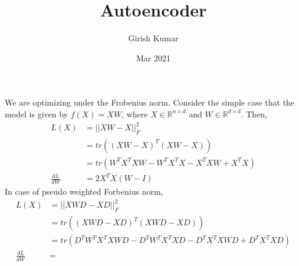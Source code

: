 \documentclass{article}
\title{Autoencoder}
\author{Girish Kumar }
\date{Mar 2021}
\begin{document}
\maketitle

We are optimizing under the Frobenius norm. Consider the simple case that the model is given by $f(X) = XW$, where $X \in \mathbb{R}^{n \times d}$ and $W \in \mathbb{R}^{d \times d}$. Then,
\begin{align*}
    L(X) &= ||XW-X||_F^2\\
        &= tr((XW-X)^T(XW-X))\\
        &= tr(W^TX^TXW - W^TX^TX - X^TXW + X^TX)\\
    \frac{dL}{dW} &= 2X^TX(W -I)
\end{align*}
In case of pseudo weighted Forbenius norm,
\begin{align*}
    L(X) &= ||XWD-XD||_F^2\\
        &= tr((XWD-XD)^T(XWD-XD))\\
        &= tr(D^TW^TX^TXWD - D^TW^TX^TXD - D^TX^TXWD + D^TX^TXD)\\
    \frac{dL}{dW} &= 
\end{align*}
\end{document}
